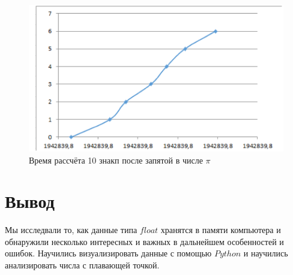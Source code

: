 \documentclass[a4paper, 12pt]{article}
\begin{document}
\begin{enumerate}
                \begin{figure}[h!]
    	        \centering
    	        \includegraphics[scale = 0.25]{5-4.png}
    		    \caption{Время рассчёта 10 знакп после запятой в числе $\pi$}
                    \label{fig:my_label}
        		\end{figure}
        \section{Вывод}
        Мы исследвали то, как данные типа $float$ хранятся в памяти компьютера и обнаружили несколько интересных и важных в дальнейшем особенностей и ошибок. Научились визуализировать данные с помощью $Python$ и научились анализировать числа с плавающей точкой.
                

    \end{enumerate}
\end{document}
